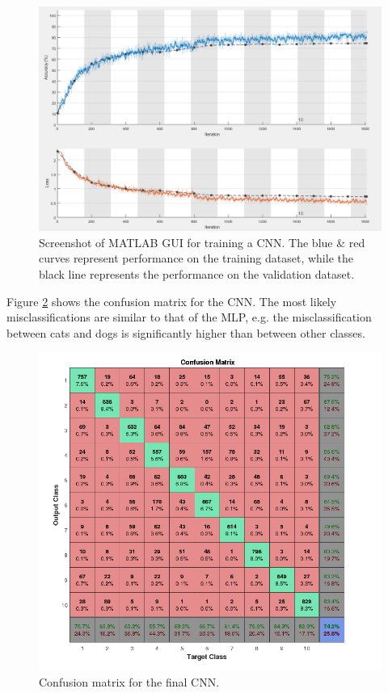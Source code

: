\begin{figure}[h!]
	\centering
	\includegraphics[width=\textwidth]{images/CNNTrain}
	\caption{Screenshot of MATLAB GUI for training a CNN. The blue \& red curves represent performance on the training dataset, while the black line represents the performance on the validation dataset.}
	\label{fig:CNNTrain}
\end{figure}

Figure \ref{fig:CNNConfusion} shows the confusion matrix for the CNN. The most likely misclassifications are similar to that of the MLP, e.g. the misclassification between cats and dogs is significantly higher than between other classes.

\begin{figure}[h!]
	\centering
	\includegraphics[width=\textwidth]{images/Confusion_MatrixCNN.png}
	\caption{Confusion matrix for the final CNN.}
	\label{fig:CNNConfusion}
\end{figure}
\FloatBarrier
